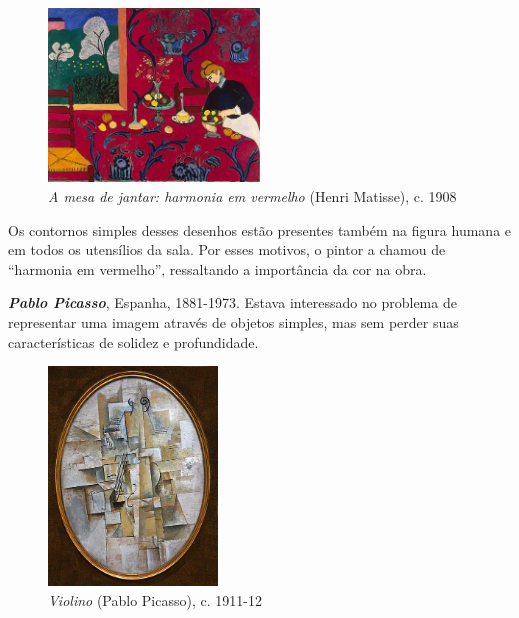\begin{figure}
  \begin{centering}
    \caption{\emph{A mesa de jantar: harmonia em vermelho} (Henri Matisse), c. 1908}
    \label{fig:matisse:red}
    \includegraphics[width=0.5\textwidth]{figs/matisse_red.png}
  \end{centering}
\end{figure}

Os contornos simples desses desenhos estão presentes também na
figura humana e em todos os utensílios da sala. Por esses motivos, o
pintor a chamou de ``harmonia em vermelho'', ressaltando a importância
da cor na obra.~\cite{matisse}


\textbf{\emph{Pablo Picasso}}, Espanha, 1881-1973. Estava interessado
no problema de representar uma imagem através de objetos simples, mas
sem perder suas características de solidez e
profundidade.~\cite{daix,gombrich} 

\begin{figure}
  \begin{centering}
    \caption{\emph{Violino} (Pablo Picasso), c. 1911-12}
    \label{fig:picasso:violino}
    \includegraphics[width=0.4\textwidth]{figs/picasso_violino.png}
  \end{centering}
\end{figure}

